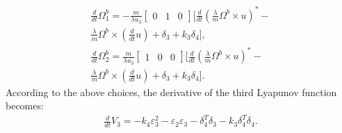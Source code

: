 \begin{gather*}
	\frac{d}{dt} \Omega^b_1 = -\frac{m}{\lambda u_3}\begin{bmatrix}0 & 1 & 0\end{bmatrix}\bigg[ \frac{d}{dt} \left( \frac{\lambda}{m} \Omega^b \times u \right)^* -\\ \frac{\lambda}{m} \Omega^b \times \left(\frac{d}{dt} u\right) + \delta_3 + k_3\delta_4 \bigg], \\
	\frac{d}{dt} \Omega^b_2 = \frac{m}{\lambda u_3}\begin{bmatrix}1 & 0 & 0\end{bmatrix}\bigg[ \frac{d}{dt} \left( \frac{\lambda}{m} \Omega^b \times u \right)^* -\\ \frac{\lambda}{m} \Omega^b \times \left(\frac{d}{dt} u\right) + \delta_3 + k_3\delta_4 \bigg].
\end{gather*}
According to the above choices, the derivative of the third Lyapunov function becomes:
\begin{align*}
	\frac{d}{dt}V_3 = -k_4\varepsilon^2_3 - \varepsilon_2\varepsilon_3 - \delta_4^T\delta_3 - k_3\delta_4^T\delta_4.
\end{align*}

